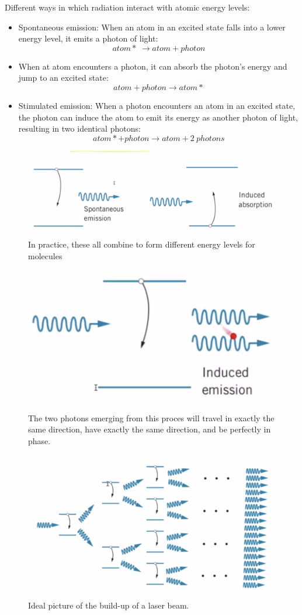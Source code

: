 \documentclass[class=article,crop=false]{standalone}
\begin{document}
Different ways in which radiation interact with atomic energy levels:
\begin{itemize}
	\item Spontaneous emission: When an atom in an excited state falls into a lower energy level, it emits a photon of light:
		$$ atom*\ \rightarrow atom + photon $$
	\item When at atom encounters a photon, it can absorb the photon's energy and jump to an excited state:
		$$ atom + photon \rightarrow atom* $$
	\item Stimulated emission: When a photon encounters an atom in an excited state, the photon can induce the atom to emit its energy as another photon of light, resulting in two identical photons:
		$$ atom* + photon \rightarrow atom + 2\ photons $$
\end{itemize}

\begin{figure}[h!]
	\centering
	\includegraphics[width=.6\linewidth]{./Images/emission2.png}
	\caption{In practice, these all combine to form different energy levels for molecules}
\end{figure}
\begin{figure}[h!]
	\centering
	\includegraphics[width=.6\linewidth]{./Images/emission3.png}
	\caption{The two photons emerging from this proces will travel in exactly the same direction, have exactly the same direction, and be perfectly in phase.}
\end{figure}

\begin{figure}[h!]
	\centering
	\includegraphics[width=.6\linewidth]{./Images/laser.png}
	\caption{Ideal picture of the build-up of a laser beam.}
\end{figure}
\end{document}
